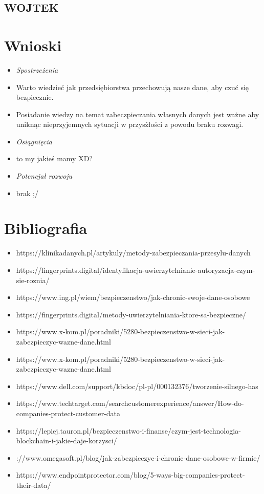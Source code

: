 \documentclass[12pt,a4paper]{article}
\begin{document}
\subsection{WOJTEK}














\newpage
\section{Wnioski}

\begin{itemize}
\item \textit{Spostrzeżenia}
\item Warto wiedzieć jak przedsiębiorstwa przechowują nasze dane, aby czuć się bezpiecznie.
\item Posiadanie wiedzy na temat zabeczpieczania własnych danych jest ważne aby uniknąc nieprzyjemnych sytuacji w przysżłości z powodu braku rozwagi.
\item \textit{Osiągnięcia}
\item to my jakieś mamy XD?
\item \textit{Potencjał rozwoju}
\item brak ;/
\end{itemize}
\section{Bibliografia}
\begin{itemize}
    \item https://klinikadanych.pl/artykuly/metody-zabezpieczania-przesylu-danych 
    \item https://fingerprints.digital/identyfikacja-uwierzytelnianie-autoryzacja-czym-sie-roznia/ 
    \item https://www.ing.pl/wiem/bezpieczenstwo/jak-chronic-swoje-dane-osobowe 
    \item https://fingerprints.digital/metody-uwierzytelniania-ktore-sa-bezpieczne/ 
    \item https://www.x-kom.pl/poradniki/5280-bezpieczenstwo-w-sieci-jak-zabezpieczyc-wazne-dane.html 
    \item https://www.x-kom.pl/poradniki/5280-bezpieczenstwo-w-sieci-jak-zabezpieczyc-wazne-dane.html 
    \item https://www.dell.com/support/kbdoc/pl-pl/000132376/tworzenie-silnego-has%
    \item https://www.techtarget.com/searchcustomerexperience/answer/How-do-companies-protect-customer-data 
    \item https://lepiej.tauron.pl/bezpieczenstwo-i-finanse/czym-jest-technologia-blockchain-i-jakie-daje-korzysci/ 
    \item ://www.omegasoft.pl/blog/jak-zabezpieczyc-i-chronic-dane-osobowe-w-firmie/ 
    \item https://www.endpointprotector.com/blog/5-ways-big-companies-protect-their-data/ 
\end{itemize}
\end{document}
